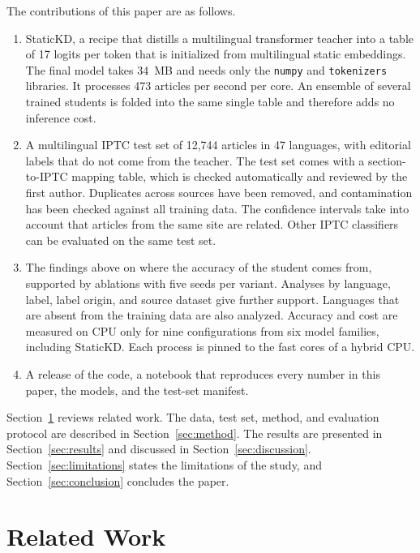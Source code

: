 \documentclass[journal]{IEEEtran}
\begin{document}
The contributions of this paper are as follows.
\begin{enumerate}
  \item StaticKD, a recipe that distills a multilingual transformer teacher into a table of 17 logits per token that is initialized from multilingual static embeddings. The final model takes 34~MB and needs only the \texttt{numpy} and \texttt{tokenizers} libraries. It processes 473 articles per second per core. An ensemble of several trained students is folded into the same single table and therefore adds no inference cost.
  \item A multilingual IPTC test set of 12,744 articles in 47 languages, with editorial labels that do not come from the teacher. The test set comes with a section-to-IPTC mapping table, which is checked automatically and reviewed by the first author. Duplicates across sources have been removed, and contamination has been checked against all training data. The confidence intervals take into account that articles from the same site are related. Other IPTC classifiers can be evaluated on the same test set.
  \item The findings above on where the accuracy of the student comes from, supported by ablations with five seeds per variant. Analyses by language, label, label origin, and source dataset give further support. Languages that are absent from the training data are also analyzed. Accuracy and cost are measured on CPU only for nine configurations from six model families, including StaticKD. Each process is pinned to the fast cores of a hybrid CPU.
  \item A release of the code, a notebook that reproduces every number in this paper, the models, and the test-set manifest.
\end{enumerate}

Section~\ref{sec:related} reviews related work. The data, test set, method, and evaluation protocol are described in Section~\ref{sec:method}. The results are presented in Section~\ref{sec:results} and discussed in Section~\ref{sec:discussion}. Section~\ref{sec:limitations} states the limitations of the study, and Section~\ref{sec:conclusion} concludes the paper.

\section{Related Work}
\label{sec:related}
\end{document}
